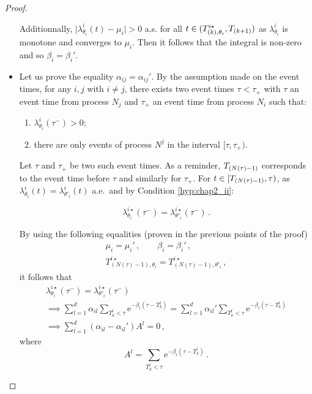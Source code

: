 \begin{subappendices}
\begin{proof}
\begin{itemize}
          Additionnally,  $\lvert \lambda_{\theta_i}^i(t) - \mu_i \rvert > 0$ a.s. for all $t\in(T_{(k),\theta_i}^{i\star}, T\park[k+1])$ as $\lambda^i_{\theta_i}$ is monotone and converges to $\mu_i$. Then it follows that the integral is non-zero and so $\beta_i = \beta_i'$.        
      
      \item Let us prove the equality $\alpha_{ij} = \alpha_{ij}'$. 
      By the assumption made on the event times, for any $i,j$ with $i\neq j$, there exists two event times $\tau < \tau_+$ with $\tau$ an event time from process $N_j$ and $\tau_+$ an event time from process $N_i$ such that:
      \begin{enumerate}
          \item $\lambda_{\theta_i}^i(\tau^-) > 0$;
          \item there are only events of process $N^j$ in the interval $[\tau, \tau_+)$.
      \end{enumerate} 
      
      Let $\tau$ and $\tau_+$ be two such event times. 
      As a reminder, $T\park[N(\tau) - 1]$ corresponds to the event time before $\tau$ and similarly for $\tau_+$. 
      For $t \in [T\park[N(\tau) - 1], \tau)$, as $\lambda_{\theta_i}^i(t) = \lambda_{\theta'_i}^i(t)$ a.e.\ and by Condition \ref{hyp:chap2_ii}:
      
      \begin{equation*}
          \lambda_{\theta_i}^{i\star}(\tau^-) = \lambda_{\theta'_i}^{i\star}(\tau^-) \,.
      \end{equation*}
      
      
      By using the following equalities (proven in the previous points of the proof) 
      \begin{gather*}
      \mu_i = {\mu_i}'\,, \qquad \beta_i = \beta_i' \,,\\
      T_{(N(\tau) - 1), \theta_i}^{i\star} = T_{(N(\tau) - 1), \theta'_i}^{i\star}\,,
      \end{gather*} 
      it follows that 
      \begin{gather}
      \lambda_{\theta_i}^{i\star}(\tau^-) = \lambda_{\theta'_i}^{i\star}(\tau^-)\nonumber\\
      \implies \sum_{l=1}^{d}{\alpha_{il}\sum_{T_k^l < \tau}{\mathrm{e}^{-\beta_i(\tau - T_k^l)}}} =\sum_{l=1}^{d}{\alpha_{il}'\sum_{T_k^l < \tau}{\mathrm{e}^{-\beta_i(\tau - T_k^l)}}}\nonumber\\
      \implies \sum_{l=1}^{d}{(\alpha_{il} - \alpha_{il}')A^l}= 0\,,\label{eq:chap2_A^l}
      \end{gather}
      where \[A^l = \sum_{T_k^l < \tau}{\mathrm{e}^{-\beta_i(\tau - T_k^l)}}\,.\]
      

\end{itemize}
\end{proof}
\end{subappendices}
